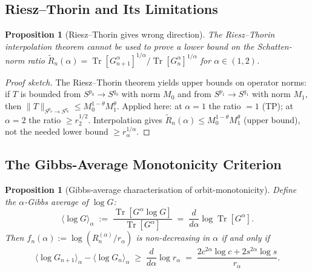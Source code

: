 \documentclass[12pt,a4paper]{article}
\newtheorem{proposition}[theorem]{Proposition}
\begin{document}
\subsection{Riesz--Thorin and Its Limitations}
\label{sec:rt_fails}

\begin{proposition}[Riesz--Thorin gives wrong direction]
\label{prop:rt_wrong}
The Riesz--Thorin interpolation theorem cannot be used to prove a
\emph{lower} bound on the Schatten-norm ratio
$\widetilde{R}_n(\alpha)=\operatorname{Tr}[G_{n+1}^\alpha]^{1/\alpha}
/\operatorname{Tr}[G_n^\alpha]^{1/\alpha}$ for $\alpha\in(1,2)$.
\end{proposition}

\begin{proof}[Proof sketch]
The Riesz--Thorin theorem yields upper bounds on operator norms:
if $T$ is bounded from $S^{p_0}\to S^{q_0}$ with norm $M_0$ and from
$S^{p_1}\to S^{q_1}$ with norm $M_1$, then
$\|T\|_{S^{p_\theta}\to S^{q_\theta}}\leq M_0^{1-\theta}M_1^\theta$.
Applied here: at $\alpha=1$ the ratio $= 1$ (TP); at $\alpha=2$ the ratio $\geq r_2^{1/2}$.
Interpolation gives $\widetilde{R}_n(\alpha)\leq M_0^{1-\theta}M_1^\theta$
(upper bound), not the needed lower bound $\geq r_\alpha^{1/\alpha}$.
\end{proof}

\subsection{The Gibbs-Average Monotonicity Criterion}
\label{sec:gibbs_mono}

\begin{proposition}[Gibbs-average characterisation of orbit-monotonicity]
\label{prop:gibbs_criterion}
Define the $\alpha$-Gibbs average of $\log G$:
\[
  \langle\log G\rangle_\alpha
  \;:=\; \frac{\operatorname{Tr}[G^\alpha\log G]}{\operatorname{Tr}[G^\alpha]}
  \;=\; \frac{d}{d\alpha}\log\operatorname{Tr}[G^\alpha].
\]
Then $f_n(\alpha):=\log(R_n^{(\alpha)}/r_\alpha)$ is non-decreasing in $\alpha$ if and only if
\begin{equation}
\label{eq:gibbs_cond}
  \langle\log G_{n+1}\rangle_\alpha - \langle\log G_n\rangle_\alpha
  \;\geq\; \frac{d}{d\alpha}\log r_\alpha
  \;=\; \frac{2c^{2\alpha}\log c + 2s^{2\alpha}\log s}{r_\alpha}.
\end{equation}
\end{proposition}
\end{document}
